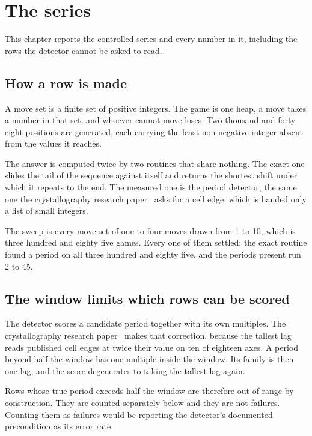 \chapter{The series}

This chapter reports the controlled series and every number in it, including the rows the
detector cannot be asked to read.

\section{How a row is made}

A move set is a finite set of positive integers. The game is one heap, a move takes a number in that
set, and whoever cannot move loses. Two thousand and forty eight positions are generated, each
carrying the least non-negative integer absent from the values it reaches.

The answer is computed twice by two routines that share nothing. The exact one slides the tail of
the sequence against itself and returns the shortest shift under which it repeats to the end. The
measured one is the period detector, the same one the crystallography research paper~\cite{src:Quigg-crystallography} asks for a cell edge, which is handed only a list of small
integers.

The sweep is every move set of one to four moves drawn from 1 to 10, which is three hundred and
eighty five games. Every one of them settled: the exact routine found a period on all three hundred
and eighty five, and the periods present run 2 to 45.

\section{The window limits which rows can be scored}

The detector scores a candidate period together with its own multiples. The crystallography research paper~\cite{src:Quigg-crystallography} makes that
correction, because the tallest lag reads published cell edges at twice their value on ten of
eighteen axes. A period beyond half the window has one multiple inside the window. Its family is then one lag,
and the score degenerates to taking the tallest lag again.

Rows whose true period exceeds half the window are therefore out of range by construction. They are
counted separately below and they are not failures. Counting them as failures would be reporting the
detector's documented precondition as its error rate.

